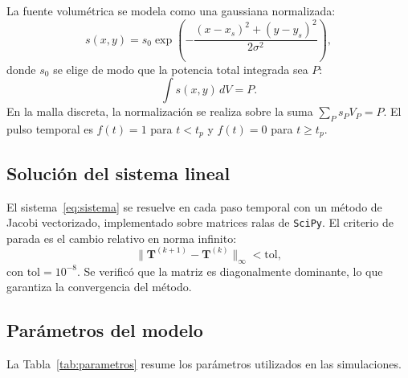 \documentclass[11pt,a4paper]{article}
\begin{document}
La fuente volumétrica se modela como una gaussiana normalizada:
\begin{equation}
s(x,y) = s_0 \exp\left(-\frac{(x-x_s)^2 + (y-y_s)^2}{2\sigma^2}\right),
\label{eq:gaussiana}
\end{equation}
donde $s_0$ se elige de modo que la potencia total integrada sea $P$:
\begin{equation}
\int s(x,y)\,dV = P.
\label{eq:potencia}
\end{equation}
En la malla discreta, la normalización se realiza sobre la suma $\sum_P s_P V_P = P$. El pulso temporal es $f(t) = 1$ para $t < t_p$ y $f(t) = 0$ para $t \geq t_p$.

\subsection{Solución del sistema lineal}

El sistema~\eqref{eq:sistema} se resuelve en cada paso temporal con un método de Jacobi vectorizado, implementado sobre matrices ralas de \texttt{SciPy}. El criterio de parada es el cambio relativo en norma infinito:
\begin{equation}
\|\mathbf{T}^{(k+1)} - \mathbf{T}^{(k)}\|_\infty < \text{tol},
\label{eq:criterio}
\end{equation}
con $\text{tol} = 10^{-8}$. Se verificó que la matriz es diagonalmente dominante, lo que garantiza la convergencia del método.

\subsection{Parámetros del modelo}

La Tabla~\ref{tab:parametros} resume los parámetros utilizados en las simulaciones.
\end{document}
